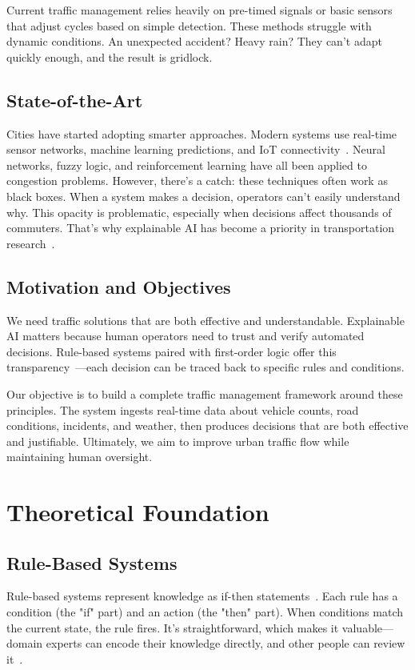 \documentclass{article}
\begin{document}
Current traffic management relies heavily on pre-timed signals or basic sensors that adjust cycles based on simple detection. These methods struggle with dynamic conditions. An unexpected accident? Heavy rain? They can't adapt quickly enough, and the result is gridlock.

\subsection{State-of-the-Art}
Cities have started adopting smarter approaches. Modern systems use real-time sensor networks, machine learning predictions, and IoT connectivity~\cite{russell_ai_2009}. Neural networks, fuzzy logic, and reinforcement learning have all been applied to congestion problems. However, there's a catch: these techniques often work as black boxes. When a system makes a decision, operators can't easily understand why. This opacity is problematic, especially when decisions affect thousands of commuters. That's why explainable AI has become a priority in transportation research~\cite{spillo_neuro_symbolic_2024}.

\subsection{Motivation and Objectives}
We need traffic solutions that are both effective and understandable. Explainable AI matters because human operators need to trust and verify automated decisions. Rule-based systems paired with first-order logic offer this transparency~\cite{xu_consistency_2006, karagiannis_wissensmanagement_2001}—each decision can be traced back to specific rules and conditions.

Our objective is to build a complete traffic management framework around these principles. The system ingests real-time data about vehicle counts, road conditions, incidents, and weather, then produces decisions that are both effective and justifiable. Ultimately, we aim to improve urban traffic flow while maintaining human oversight.

\section{Theoretical Foundation}

\subsection{Rule-Based Systems}
Rule-based systems represent knowledge as if-then statements~\cite{russell_ai_2009}. Each rule has a condition (the "if" part) and an action (the "then" part). When conditions match the current state, the rule fires. It's straightforward, which makes it valuable—domain experts can encode their knowledge directly, and other people can review it~\cite{karagiannis_wissensmanagement_2001}.
\end{document}
